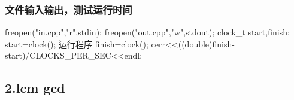 \documentclass[
]{article}
\newenvironment{Shaded}{}{}
\newcommand{\DataTypeTok}[1]{\textcolor[rgb]{0.56,0.13,0.00}{#1}}
\newcommand{\NormalTok}[1]{#1}
\newcommand{\OperatorTok}[1]{\textcolor[rgb]{0.40,0.40,0.40}{#1}}
\newcommand{\StringTok}[1]{\textcolor[rgb]{0.25,0.44,0.63}{#1}}
\begin{document}
\hypertarget{ux6587ux4ef6ux8f93ux5165ux8f93ux51faux6d4bux8bd5ux8fd0ux884cux65f6ux95f4}{%
\subsubsection{文件输入输出，测试运行时间}\label{ux6587ux4ef6ux8f93ux5165ux8f93ux51faux6d4bux8bd5ux8fd0ux884cux65f6ux95f4}}

\begin{Shaded}
\begin{Highlighting}[]
\NormalTok{	freopen}\OperatorTok{(}\StringTok{"in.cpp"}\OperatorTok{,}\StringTok{"r"}\OperatorTok{,}\NormalTok{stdin}\OperatorTok{);}
\NormalTok{	freopen}\OperatorTok{(}\StringTok{"out.cpp"}\OperatorTok{,}\StringTok{"w"}\OperatorTok{,}\NormalTok{stdout}\OperatorTok{);}
	\DataTypeTok{clock\_t}\NormalTok{ start}\OperatorTok{,}\NormalTok{finish}\OperatorTok{;}
\NormalTok{	start}\OperatorTok{=}\NormalTok{clock}\OperatorTok{();}
\NormalTok{	运行程序}
\NormalTok{	finish}\OperatorTok{=}\NormalTok{clock}\OperatorTok{();}
\NormalTok{	cerr}\OperatorTok{\textless{}\textless{}((}\DataTypeTok{double}\OperatorTok{)}\NormalTok{finish}\OperatorTok{{-}}\NormalTok{start}\OperatorTok{)/}\NormalTok{CLOCKS\_PER\_SEC}\OperatorTok{\textless{}\textless{}}\NormalTok{endl}\OperatorTok{;}
\end{Highlighting}
\end{Shaded}

\hypertarget{2lcm-gcd}{%
\subsection{2.lcm gcd}\label{2lcm-gcd}}
\end{document}
